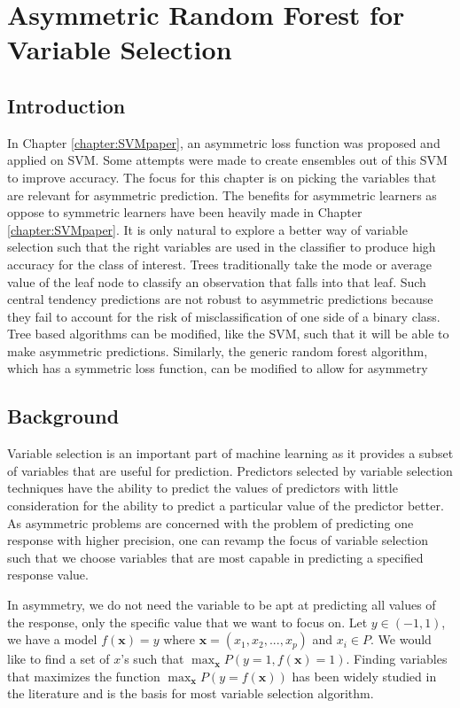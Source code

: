 
\chapter{Asymmetric Random Forest for Variable Selection}\label{chapter:AsymRFpaper}
\section{Introduction}
In Chapter \ref{chapter:SVMpaper}, an asymmetric loss function was proposed and applied on SVM. Some attempts were made to create ensembles out of this SVM to improve accuracy. The focus for this chapter is on picking the variables that are relevant for asymmetric prediction. The benefits for asymmetric learners as oppose to symmetric learners have been heavily made in Chapter \ref{chapter:SVMpaper}. It is only natural to explore a better way of variable selection such that the right variables are used in the classifier to produce high accuracy for the class of interest. Trees traditionally take the mode or average value of the leaf node to classify an observation that falls into that leaf. Such central tendency predictions are not robust to asymmetric predictions because they fail to account for the risk of misclassification of one side of a binary class. Tree based algorithms can be modified, like the SVM, such that it will be able to make asymmetric predictions. Similarly, the generic random forest algorithm, which has a symmetric loss function, can be modified to allow for asymmetry

\section{Background}
Variable selection is an important part of machine learning as it provides a subset of variables that are useful for prediction. Predictors selected by variable selection techniques have the ability to predict the values of predictors with little consideration for the ability to predict a particular value of the predictor better. As asymmetric problems are concerned with the problem of predicting one response with higher precision, one can revamp the focus of variable selection such that we choose variables that are most capable in predicting a specified response value.

In asymmetry, we do not need the variable to be apt at predicting all values of the response, only the specific value that we want to focus on. Let $y \in (-1,1)$, we have a model $f(\mathbf{x})=y$ where $\mathbf{x} = (x_1,x_2,...,x_p)$ and $x_{i} \in P$. We would like to find a set of $x$'s such that $\displaystyle\max_{\mathbf{x}}P(y=1,f(\mathbf{x})=1)$. Finding variables that maximizes the function $\displaystyle\max_{\mathbf{x}}P(y=f(\mathbf{x}))$ has been widely studied in the literature and is the basis for most variable selection algorithm. 

